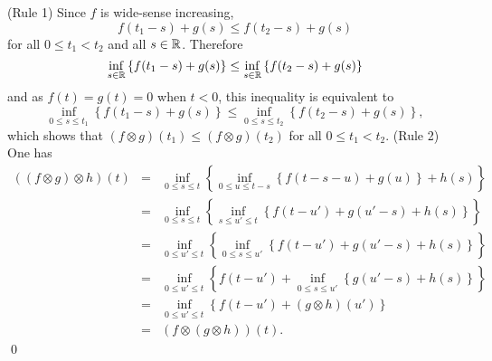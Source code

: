 \pr (Rule 1) Since $f$ is wide-sense increasing,
$$ f(t_1-s) + g(s) \leq f(t_2-s) + g(s) $$
for all $0 \leq t_1 < t_2$ and all $s \in \mathbb{R}$. Therefore
$$ \inf_{s \in \mathbb{R}} \left\{ f(t_1-s) + g(s) \right\} \leq \inf_{s \in \mathbb{R}} \left\{ f(t_2-s) + g(s) \right\} $$
and as $f(t) = g(t) = 0$ when $t < 0$, this inequality is equivalent to
$$ \inf_{0 \leq s \leq t_1} \left\{ f(t_1-s) + g(s) \right\} \leq \inf_{0 \leq s \leq t_2} \left\{ f(t_2-s) + g(s) \right\}, $$
which shows that $(f \otimes g)(t_1) \leq (f \otimes g)(t_2)$ for all $0 \leq t_1 < t_2$.
\vspace{1ex}
\noindent
(Rule 2) One has
\begin{eqnarray*}
((f \otimes g) \otimes h)(t)
& = & \inf_{0 \leq s \leq t} \left\{ \inf_{0 \leq u \leq t-s}
        \left\{ f(t-s-u) + g(u) \right\} + h(s) \right\} \\
& = & \inf_{0 \leq s \leq t} \left\{ \inf_{s \leq u' \leq t} \left\{ f(t-u') + g(u'-s) + h(s) \right\} \right\} \\
& = & \inf_{0 \leq u' \leq t} \left\{ \inf_{0 \leq s \leq u'} \left\{ f(t-u') + g(u'-s) + h(s) \right\} \right\}  \\
& = & \inf_{0 \leq u' \leq t} \left\{  f(t-u') + \inf_{0 \leq s \leq u'} \left\{ g(u'-s) + h(s) \right\} \right\}  \\
& = & \inf_{0 \leq u' \leq t} \left\{  f(t-u') + (g \otimes h)(u') \right\}  \\
& = & (f \otimes (g \otimes h))(t).
\end{eqnarray*}
\qed

